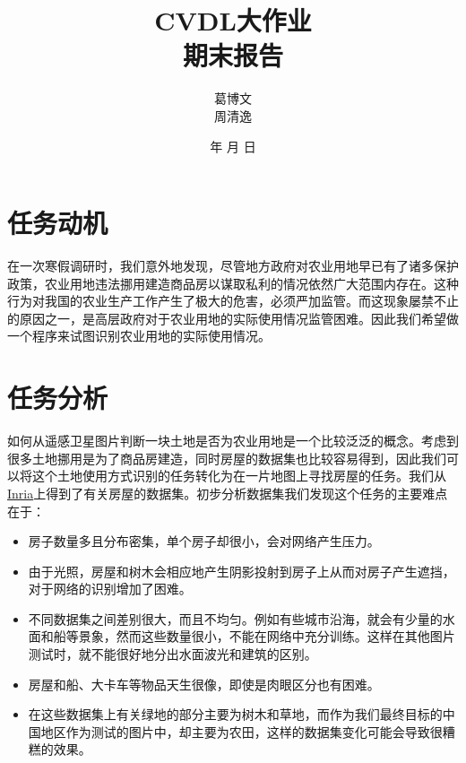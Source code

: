 \documentclass[a4paper,12pt]{article}
\renewcommand{\today}{\number\year 年 \number\month 月 \number\day 日}
\begin{document}
\begin{CJK*}{UTF8}{gbsn}

\title{\textbf{CVDL大作业\\期末报告}}
\author{葛博文\\周清逸}
\date{\today}
\maketitle

\begin{spacing}{1.2}

    \section{任务动机}
    在一次寒假调研时，我们意外地发现，尽管地方政府对农业用地早已有了诸多保护政策，农业用地违法挪用建造商品房以谋取私利的情况依然广大范围内存在。这种行为对我国的农业生产工作产生了极大的危害，必须严加监管。而这现象屡禁不止的原因之一，是高层政府对于农业用地的实际使用情况监管困难。因此我们希望做一个程序来试图识别农业用地的实际使用情况。


    \section{任务分析}
    如何从遥感卫星图片判断一块土地是否为农业用地是一个比较泛泛的概念。考虑到很多土地挪用是为了商品房建造，同时房屋的数据集也比较容易得到，因此我们可以将这个土地使用方式识别的任务转化为在一片地图上寻找房屋的任务。我们从\href{https://project.inria.fr/aerialimagelabeling/}{Inria}上得到了有关房屋的数据集\cite{maggiori2017dataset}。初步分析数据集我们发现这个任务的主要难点在于：
    \begin{itemize}
        \item 房子数量多且分布密集，单个房子却很小，会对网络产生压力。
        \item 由于光照，房屋和树木会相应地产生阴影投射到房子上从而对房子产生遮挡，对于网络的识别增加了困难。
        \item 不同数据集之间差别很大，而且不均匀。例如有些城市沿海，就会有少量的水面和船等景象，然而这些数量很小，不能在网络中充分训练。这样在其他图片测试时，就不能很好地分出水面波光和建筑的区别。
        \item 房屋和船、大卡车等物品天生很像，即使是肉眼区分也有困难。
        \item 在这些数据集上有关绿地的部分主要为树木和草地，而作为我们最终目标的中国地区作为测试的图片中，却主要为农田，这样的数据集变化可能会导致很糟糕的效果。
    \end{itemize}




\end{spacing}
\end{CJK*}
\end{document}
